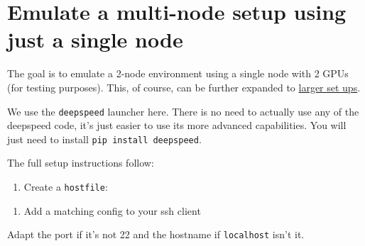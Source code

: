 \documentclass[
]{report}
\author{}
\date{2024-02-13}
\newenvironment{Shaded}{\begin{snugshade}}{\end{snugshade}}
\newcommand{\ExtensionTok}[1]{\textcolor[rgb]{0.00,0.23,0.31}{#1}}
\newcommand{\NormalTok}[1]{\textcolor[rgb]{0.00,0.23,0.31}{#1}}
\providecommand{\tightlist}{%
  \setlength{\itemsep}{0pt}\setlength{\parskip}{0pt}}\usepackage{longtable,booktabs,array}
\begin{document}
\chapter{Emulate a multi-node setup using just a single
node}\label{emulate-a-multi-node-setup-using-just-a-single-node}

The goal is to emulate a 2-node environment using a single node with 2
GPUs (for testing purposes). This, of course, can be further expanded to
\hyperref[larger-set-ups]{larger set ups}.

We use the \texttt{deepspeed} launcher here. There is no need to
actually use any of the deepspeed code, it's just easier to use its more
advanced capabilities. You will just need to install
\texttt{pip\ install\ deepspeed}.

The full setup instructions follow:

\begin{enumerate}
\def\labelenumi{\arabic{enumi}.}
\tightlist
\item
  Create a \texttt{hostfile}:
\end{enumerate}

\begin{Shaded}
\end{Shaded}

\begin{enumerate}
\def\labelenumi{\arabic{enumi}.}
\setcounter{enumi}{1}
\tightlist
\item
  Add a matching config to your ssh client
\end{enumerate}

\begin{Shaded}
\end{Shaded}

Adapt the port if it's not 22 and the hostname if \texttt{localhost}
isn't it.
\end{document}
